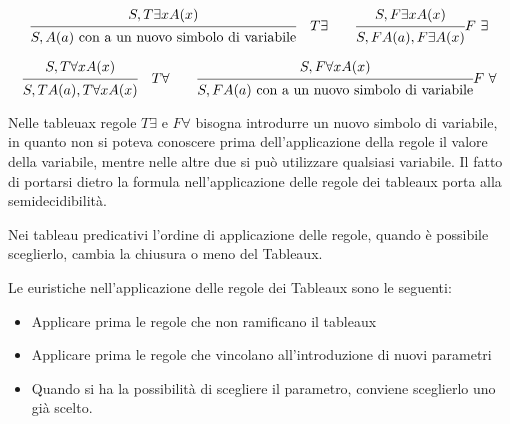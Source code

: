\begin{equation*}
\begin{prooftree}%
\hypo{S,T \exists x A(x)}
\infer1 {S,A(a) \ \text{con a un nuovo simbolo di variabile}}
\end{prooftree}
\quad T \exists \qquad
\begin{prooftree} %
\hypo{S,F \exists x A(x)}
\infer1 {S,F A(a),F \exists A(x)}
\end{prooftree}
F \ \exists
\end{equation*}

\begin{equation*}
\begin{prooftree}%
\hypo{S,T \forall x A(x)}
\infer1 {S,T A(a),T \forall x A(x)}
\end{prooftree}
\quad T \forall \qquad
\begin{prooftree}%
\hypo{S,F \forall x A(x)}
\infer1 {S,F A(a) \ \text{con a un nuovo simbolo di variabile}}
\end{prooftree}
F \ \forall
\end{equation*}

Nelle tableuax regole $T \exists$ e $F \forall$ bisogna introdurre un nuovo simbolo di
variabile, in quanto non si poteva conoscere prima dell'applicazione della regole
il valore della variabile, mentre nelle altre due si può utilizzare qualsiasi variabile.
Il fatto di portarsi dietro la formula nell'applicazione delle regole dei tableaux
porta alla semidecidibilità.

Nei tableau predicativi l'ordine di applicazione delle regole, quando è possibile
sceglierlo, cambia la chiusura o meno del Tableaux.

Le euristiche nell'applicazione delle regole dei Tableaux sono le seguenti:
\begin{itemize}
    \item Applicare prima le regole che non ramificano il tableaux
    \item Applicare prima le regole che vincolano all'introduzione di nuovi parametri
    \item Quando si ha la possibilità di scegliere il parametro, conviene sceglierlo uno già scelto.
\end{itemize}



